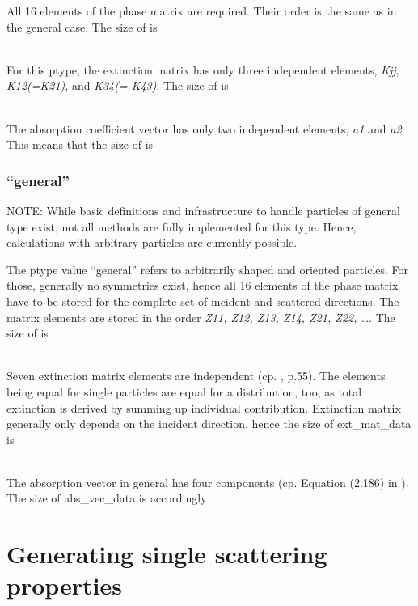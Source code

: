 All 16 elements of the phase matrix are required. Their order is the same as in
the general case. The size of  is

\\
For this ptype, the extinction matrix has only three independent elements, {\sl
Kjj}, {\sl K12(=K21)}, and {\sl K34(=-K43)}. The size of
 is

\shortcode{[N\_f N\_T N\_za 1 3]}\\
The absorption coefficient vector has only two independent elements, {\sl a1} and
{\sl a2}. This means that the size of  is 

\shortcode{[N\_f N\_T N\_za 1 2]}

\subsubsection{``general''}

NOTE: While basic definitions and infrastructure to handle particles of general
type exist, not all methods are fully implemented for this type. Hence,
calculations with arbitrary particles are currently possible.

The ptype value ``general'' refers to arbitrarily shaped and oriented particles.
For those, generally no symmetries exist, hence all 16 elements of
the phase matrix have to be stored for the complete set of incident and
scattered directions. The matrix elements are stored in the order {\sl Z11,
Z12, Z13, Z14, Z21, Z22, \dots}. The size of  is

\\
Seven extinction matrix elements are independent (cp. \citet{Mishchenko:02},
p.55). The elements being equal for single particles are equal for a
distribution, too, as total extinction is derived by summing up individual
contribution. Extinction matrix generally only depends on the incident
direction, hence the size of ext\_mat\_data is

\\
The absorption vector in general has four components (cp. Equation
(2.186) in \citet{Mishchenko:02}). The size of abs\_vec\_data is
accordingly



\section{Generating single scattering properties}
\label{sec:clouds:ssdgen}


